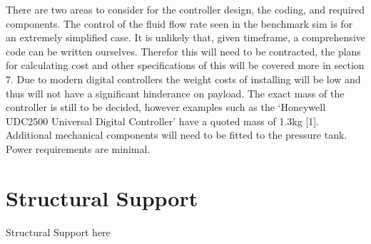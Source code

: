 There are two areas to consider for the controller design, the coding, and required components. The control of the fluid flow rate seen in the benchmark sim is for an extremely simplified case. It is unlikely that, given timeframe, a comprehensive code can be written ourselves. Therefor this will need to be contracted, the plans for calculating cost and other specifications of this will be covered more in section 7.
Due to modern digital controllers the weight costs of installing will be low and thus will not have a significant hinderance on payload. The exact mass of the controller is still to be decided, however examples such as the ‘Honeywell UDC2500 Universal Digital Controller’ have a quoted mass of 1.3kg [1]. Additional mechanical components will need to be fitted to the pressure tank. Power requirements are minimal.


\section{Structural Support}
Structural Support here
